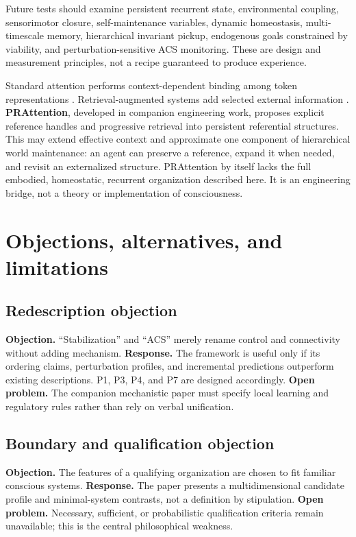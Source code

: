 \documentclass[
  11pt,
  a4paper,
]{article}
\begin{document}
Future tests should examine persistent recurrent state, environmental
coupling, sensorimotor closure, self-maintenance variables, dynamic
homeostasis, multi-timescale memory, hierarchical invariant pickup,
endogenous goals constrained by viability, and perturbation-sensitive
ACS monitoring. These are design and measurement principles, not a
recipe guaranteed to produce experience.

Standard attention performs context-dependent binding among token
representations \citep{vaswani2017}. Retrieval-augmented systems add
selected external information \citep{lewis2020}. \textbf{PRAttention},
developed in companion engineering work, proposes explicit reference
handles and progressive retrieval into persistent referential
structures. This may extend effective context and approximate one
component of hierarchical world maintenance: an agent can preserve a
reference, expand it when needed, and revisit an externalized structure.
PRAttention by itself lacks the full embodied, homeostatic, recurrent
organization described here. It is an engineering bridge, not a theory
or implementation of consciousness.

\section{Objections, alternatives, and
limitations}\label{objections-alternatives-and-limitations}

\subsection{Redescription objection}\label{redescription-objection}

\textbf{Objection.} ``Stabilization'' and ``ACS'' merely rename control
and connectivity without adding mechanism. \textbf{Response.} The
framework is useful only if its ordering claims, perturbation profiles,
and incremental predictions outperform existing descriptions. P1, P3,
P4, and P7 are designed accordingly. \textbf{Open problem.} The
companion mechanistic paper must specify local learning and regulatory
rules rather than rely on verbal unification.

\subsection{Boundary and qualification
objection}\label{boundary-and-qualification-objection}

\textbf{Objection.} The features of a qualifying organization are chosen
to fit familiar conscious systems. \textbf{Response.} The paper presents
a multidimensional candidate profile and minimal-system contrasts, not a
definition by stipulation. \textbf{Open problem.} Necessary, sufficient,
or probabilistic qualification criteria remain unavailable; this is the
central philosophical weakness.
\end{document}
